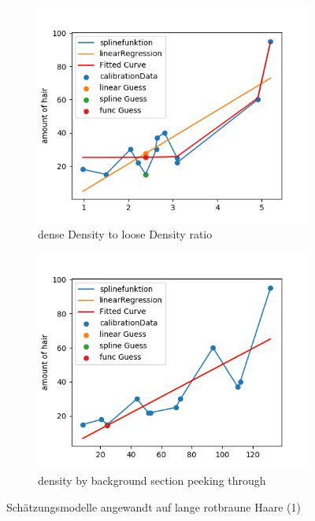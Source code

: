 \documentclass[german,a4paper, 12pt]{llncs}
\begin{document}
\begin{figure}[H]
\medskip
\begin{subfigure}{0.48\textwidth}
	\includegraphics[width=1.1\linewidth]{fig64/g05_denseDensitytolooseDensity.png}
	\caption{dense Density to loose Density ratio} \label{fig:e}
\end{subfigure}\hspace*{\fill}
\begin{subfigure}{0.48\textwidth}
	\includegraphics[width=1.1\linewidth]{fig64/g06_densitybybackgorundsections.png}
	\caption{density by background section peeking through} \label{fig:f}
\end{subfigure}


\caption{Schätzungsmodelle angewandt auf lange rotbraune Haare (1)} \label{fig:1}
\end{figure}
\end{document}
